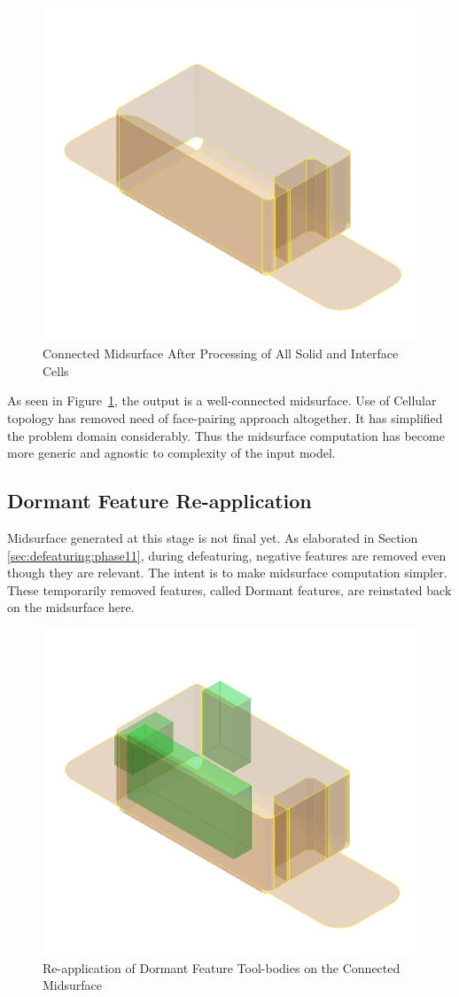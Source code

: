 \begin{figure}[!h]
\centering     %
\includegraphics[width=0.62\linewidth,valign=t]{../Common/images/SheetMetal_Medium_Enclosure_midsurf_part}
\caption{Connected Midsurface After Processing of All Solid and Interface Cells}
\label{fig:results:midsurfcells}
\end{figure}




As seen in Figure~\ref{fig:results:midsurfcells}, the output is a well-connected midsurface. Use of Cellular topology has removed need of face-pairing approach altogether. It has simplified the problem domain considerably. Thus the midsurface computation has become more generic and agnostic to complexity of the input model.


\subsection{Dormant Feature Re-application}

Midsurface generated at this stage is not final yet. As elaborated in Section \ref{sec:defeaturing:phase11}, during defeaturing, negative features are removed even though they are  relevant. The intent is to make midsurface computation simpler. These temporarily removed features, called Dormant features, are reinstated back on the midsurface here.




\begin{figure}[!h]
\centering     %
\includegraphics[width=0.62\linewidth,valign=t]{../Common/images/SheetMetal_Medium_Enclosure_dormant_part}
\caption{Re-application of Dormant Feature Tool-bodies on the Connected Midsurface}
\label{fig:results:dormantenclosure}
\end{figure}



